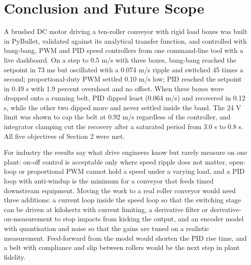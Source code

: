 \documentclass[12pt,a4paper]{article}
\begin{document}
\section{Conclusion and Future Scope}

A brushed DC motor driving a ten-roller conveyor with rigid load boxes was built in PyBullet, validated against its analytical transfer function, and controlled with bang-bang, PWM and PID speed controllers from one command-line tool with a live dashboard. On a step to 0.5 m/s with three boxes, bang-bang reached the setpoint in 73 ms but oscillated with a 0.074 m/s ripple and switched 45 times a second; proportional-duty PWM settled 0.10 m/s low; PID reached the setpoint in 0.49 s with 1.9 percent overshoot and no offset. When three boxes were dropped onto a running belt, PID dipped least (0.064 m/s) and recovered in 0.12 s, while the other two dipped more and never settled inside the band. The 24 V limit was shown to cap the belt at 0.92 m/s regardless of the controller, and integrator clamping cut the recovery after a saturated period from 3.0 s to 0.8 s. All five objectives of Section 2 were met.

For industry the results say what drive engineers know but rarely measure on one plant: on-off control is acceptable only where speed ripple does not matter, open-loop or proportional PWM cannot hold a speed under a varying load, and a PID loop with anti-windup is the minimum for a conveyor that feeds timed downstream equipment. Moving the work to a real roller conveyor would need three additions: a current loop inside the speed loop so that the switching stage can be driven at kilohertz with current limiting, a derivative filter or derivative-on-measurement to stop impacts from kicking the output, and an encoder model with quantisation and noise so that the gains are tuned on a realistic measurement. Feed-forward from the model would shorten the PID rise time, and a belt with compliance and slip between rollers would be the next step in plant fidelity.
\end{document}
